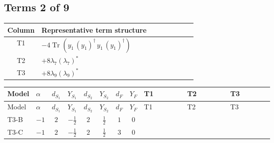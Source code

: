 \documentclass[8pt]{article}
\begin{document}
\begin{landscape}
\subsection*{Terms 2 of 9}
\begin{center}
\begin{tabular}{@{}c >{\raggedright\arraybackslash}p{0.82\linewidth}@{}}
\toprule
Column & Representative term structure \\
\midrule
T1 & \(\displaystyle -4 \operatorname{Tr}\!\left({y_1}\,\left({y_1}\right)^{\dagger}\,{y_1}\,\left({y_1}\right)^{\dagger}\right)\) \\
\midrule
T2 & \(\displaystyle +8 {\lambda_{7}} \left({\lambda_{7}}\right)^{*}\) \\
\midrule
T3 & \(\displaystyle +8 {\lambda_{9}} \left({\lambda_{9}}\right)^{*}\) \\
\midrule
\bottomrule
\end{tabular}
\end{center}
\smallskip
\tiny
\begin{longtable}{@{}llcccccc >{\raggedright\arraybackslash}p{0.21\linewidth} >{\raggedright\arraybackslash}p{0.21\linewidth} >{\raggedright\arraybackslash}p{0.21\linewidth}@{}}
\toprule
Model & $\alpha$ & $d_{S_1}$ & $Y_{S_1}$ & $d_{S_2}$ & $Y_{S_2}$ & $d_F$ & $Y_F$ & T1 & T2 & T3 \\
\midrule
\endfirsthead
\toprule
Model & $\alpha$ & $d_{S_1}$ & $Y_{S_1}$ & $d_{S_2}$ & $Y_{S_2}$ & $d_F$ & $Y_F$ & T1 & T2 & T3 \\
\midrule
\endhead
T3-B & $-1$ & $2$ & $-\frac{1}{2}$ & $2$ & $\frac{1}{2}$ & $1$ & $0$ & \scriptsize\adjustbox{max width=\linewidth}{$\begin{gathered} -4 \operatorname{Tr}\!\left({y_1}\,\left({y_1}\right)^{\dagger}\,{y_1}\,\left({y_1}\right)^{\dagger}\right)\end{gathered}$} & \scriptsize\adjustbox{max width=\linewidth}{$\begin{gathered} +8 {\lambda_{7}} \left({\lambda_{7}}\right)^{*}\end{gathered}$} & \scriptsize\adjustbox{max width=\linewidth}{$\begin{gathered} +8 {\lambda_{9}} \left({\lambda_{9}}\right)^{*}\end{gathered}$} \\
\midrule
T3-C & $-1$ & $2$ & $-\frac{1}{2}$ & $2$ & $\frac{1}{2}$ & $3$ & $0$ & \scriptsize\adjustbox{max width=\linewidth}{$\begin{gathered} -5 \operatorname{Tr}\!\left({y_1}\,\left({y_1}\right)^{\dagger}\,{y_1}\,\left({y_1}\right)^{\dagger}\right)\end{gathered}$} & \scriptsize\adjustbox{max width=\linewidth}{$\begin{gathered} +8 {\lambda_{7}} \left({\lambda_{7}}\right)^{*}\end{gathered}$} & \scriptsize\adjustbox{max width=\linewidth}{$\begin{gathered} +8 {\lambda_{9}} \left({\lambda_{9}}\right)^{*}\end{gathered}$} \\

\end{longtable}
\end{landscape}
\end{document}
